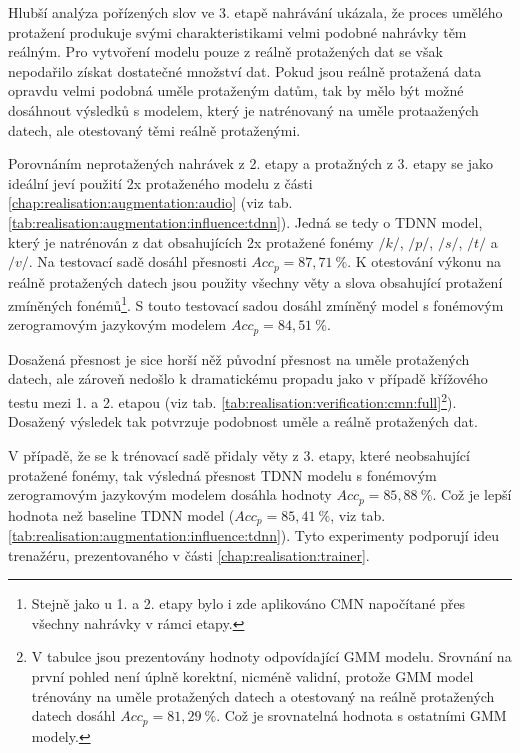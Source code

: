 Hlubší analýza pořízených slov ve 3. etapě nahrávání ukázala, že proces umělého protažení produkuje svými charakteristikami velmi podobné nahrávky těm reálným. Pro vytvoření modelu pouze z reálně protažených dat se však nepodařilo získat dostatečné množství dat. Pokud jsou reálně protažená data opravdu velmi podobná uměle protaženým datům, tak by mělo být možné dosáhnout  výsledků s modelem, který je natrénovaný na uměle protaažených datech, ale otestovaný těmi reálně protaženými.

Porovnáním neprotažených nahrávek z 2. etapy a protažných z 3. etapy se jako ideální jeví použití 2x protaženého modelu z části \ref{chap:realisation:augmentation:audio} (viz tab. \ref{tab:realisation:augmentation:influence:tdnn}). Jedná se tedy o TDNN model, který je natrénován z dat obsahujících 2x protažené fonémy $/k/$, $/p/$, $/s/$, $/t/$ a $/v/$.  Na testovací sadě dosáhl přesnosti $Acc_{p} = 87,71\ \%$. K otestování výkonu na reálně protažených datech jsou použity všechny věty a slova obsahující protažení zmíněných fonémů\footnote{Stejně jako u 1. a 2. etapy bylo i zde aplikováno CMN napočítané přes všechny nahrávky v rámci etapy.}. S touto testovací sadou dosáhl zmíněný model s fonémovým zerogramovým jazykovým modelem $Acc_{p} = 84,51\ \%$.

Dosažená přesnost je sice horší něž původní přesnost na uměle protažených datech, ale zároveň nedošlo k dramatickému propadu jako v případě křížového testu mezi 1. a 2. etapou (viz tab. \ref{tab:realisation:verification:cmn:full}\footnote{V tabulce jsou prezentovány hodnoty odpovídající GMM modelu. Srovnání na první pohled není úplně korektní, nicméně validní, protože GMM model trénovány na uměle protažených datech a otestovaný na reálně protažených datech dosáhl $Acc_{p} = 81,29\ \%$. Což je srovnatelná hodnota s ostatními GMM modely.}). Dosažený výsledek tak potvrzuje podobnost uměle a reálně protažených dat.

V případě, že se k trénovací sadě přidaly věty z 3. etapy, které neobsahující protažené fonémy, tak výsledná přesnost TDNN modelu s fonémovým zerogramovým jazykovým modelem dosáhla hodnoty $Acc_{p} = 85,88\ \%$. Což je lepší hodnota než baseline TDNN model ($Acc_{p} = 85,41\ \%$, viz tab. \ref{tab:realisation:augmentation:influence:tdnn}). Tyto experimenty podporují ideu trenažéru, prezentovaného v části \ref{chap:realisation:trainer}.
